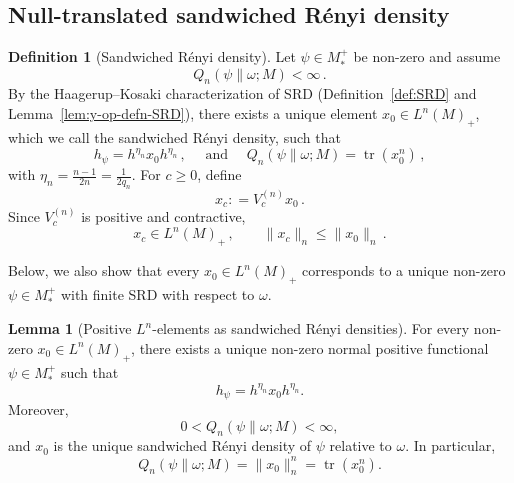 \documentclass[11pt,a4paper]{article}
\theoremstyle{plain}
\numberwithin{theorem}{section}
\theoremstyle{definition}
\newtheorem{definition}[theorem]{Definition}
\newtheorem{lemma}[theorem]{Lemma}
\newcommand{\?}{\overset{?}{=}}
\newcommand{\defeq}{\mathrel{\mathop:}=}
\DeclareMathOperator{\tr}{tr}
\begin{document}
\subsection{Null-translated sandwiched R\'enyi density}
\label{subsec:integer-density-propagation}
\begin{definition}[Sandwiched R\'{e}nyi density]\label{defn:renyi-density}
Let $\psi\in M_*^+$ be non-zero and assume
\begin{equation}
  Q_n(\psi\|\omega;M)<\infty\,.
\end{equation}
By the Haagerup--Kosaki characterization of SRD (Definition~\ref{def:SRD} and Lemma~\ref{lem:y-op-defn-SRD}), there exists a unique element $x_0\in L^n(M)_+$, which we call the sandwiched R\'enyi density, 
such that
\begin{equation}
  h_\psi=h^{\eta_n}x_0h^{\eta_n}\,, \quad\text{ and }\quad Q_n(\psi\|\omega;M)=\tr(x_0^n)\,,
\end{equation}
with $\eta_n= \frac{n-1}{2n}=\frac1{2q_n}$. 
For $c\geq 0$, define
\begin{equation}
  x_c \defeq V_c^{(n)}x_0\,.
\end{equation}
Since $V_c^{(n)}$ is positive and contractive,
\begin{equation}
  x_c\in L^n(M)_+\,,
  \qquad
  \|x_c\|_n\leq \|x_0\|_n\,.
\end{equation}
\end{definition}
Below, we also show that every $x_0\in L^n(M)_+$ corresponds to a unique non-zero $\psi\in M_*^+$ with finite SRD with respect to $\omega$.
\begin{lemma}[Positive \(L^n\)-elements as sandwiched R\'enyi densities]
\label{lem:positive-Ln-sandwiched-density}
For every non-zero \(x_0\in L^n(M)_+\), there exists a unique
non-zero normal positive functional \(\psi\in M_*^+\) such that
\begin{equation}
    h_\psi=h^{\eta_n}x_0h^{\eta_n}.
    \label{eq:functional-from-positive-Ln}
\end{equation}
Moreover,
\[
    0<Q_n(\psi\|\omega;M)<\infty,
\]
and \(x_0\) is the unique sandwiched Rényi density of \(\psi\)
relative to \(\omega\). In particular,
\begin{equation}
    Q_n(\psi\|\omega;M)
      =\|x_0\|_n^n
      =\tr(x_0^n).
    \label{eq:Qn-positive-Ln}
\end{equation}
\end{lemma}
\end{document}
